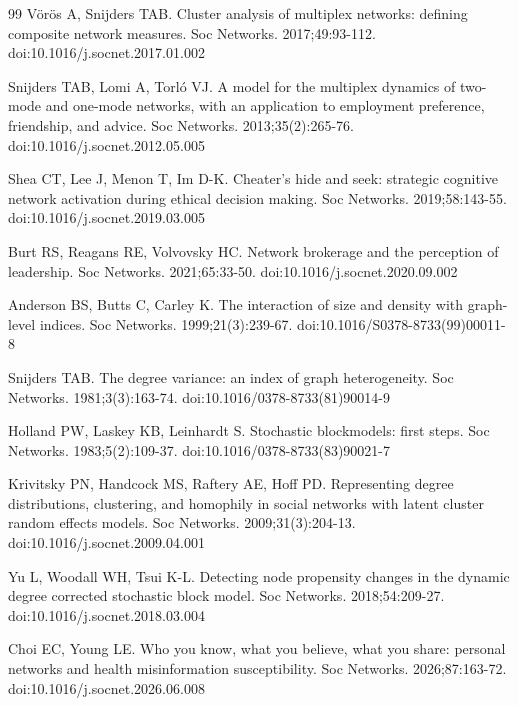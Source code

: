 \documentclass[fonts]{icst}
\theoremstyle{definition}
\begin{document}
\begin{thebibliography}{99}
V\"or\"os A, Snijders TAB. Cluster analysis of multiplex networks: defining composite network measures. Soc Networks. 2017;49:93-112. doi:10.1016/j.socnet.2017.01.002

Snijders TAB, Lomi A, Torl\'o VJ. A model for the multiplex dynamics of two-mode and one-mode networks, with an application to employment preference, friendship, and advice. Soc Networks. 2013;35(2):265-76. doi:10.1016/j.socnet.2012.05.005

Shea CT, Lee J, Menon T, Im D-K. Cheater's hide and seek: strategic cognitive network activation during ethical decision making. Soc Networks. 2019;58:143-55. doi:10.1016/j.socnet.2019.03.005

Burt RS, Reagans RE, Volvovsky HC. Network brokerage and the perception of leadership. Soc Networks. 2021;65:33-50. doi:10.1016/j.socnet.2020.09.002

Anderson BS, Butts C, Carley K. The interaction of size and density with graph-level indices. Soc Networks. 1999;21(3):239-67. doi:10.1016/S0378-8733(99)00011-8

Snijders TAB. The degree variance: an index of graph heterogeneity. Soc Networks. 1981;3(3):163-74. doi:10.1016/0378-8733(81)90014-9

Holland PW, Laskey KB, Leinhardt S. Stochastic blockmodels: first steps. Soc Networks. 1983;5(2):109-37. doi:10.1016/0378-8733(83)90021-7

Krivitsky PN, Handcock MS, Raftery AE, Hoff PD. Representing degree distributions, clustering, and homophily in social networks with latent cluster random effects models. Soc Networks. 2009;31(3):204-13. doi:10.1016/j.socnet.2009.04.001

Yu L, Woodall WH, Tsui K-L. Detecting node propensity changes in the dynamic degree corrected stochastic block model. Soc Networks. 2018;54:209-27. doi:10.1016/j.socnet.2018.03.004

Choi EC, Young LE. Who you know, what you believe, what you share: personal networks and health misinformation susceptibility. Soc Networks. 2026;87:163-72. doi:10.1016/j.socnet.2026.06.008

\end{thebibliography}


\end{document}
